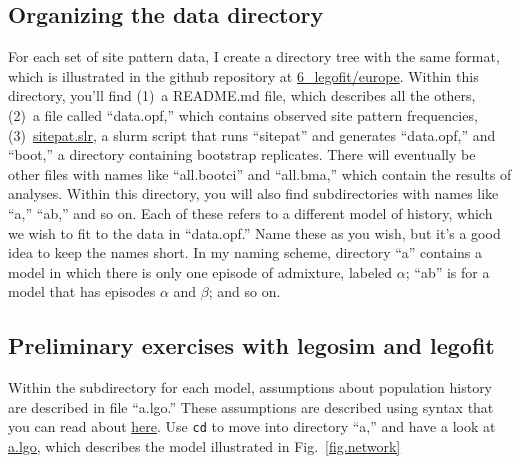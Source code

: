\documentclass[11pt]{article}
\begin{document}
\subsection{Organizing the data directory}
For each set of site pattern data, I create a directory tree with the
same format, which is illustrated in the github repository at
\href{\verb|https://github.com/alanrogers/agar22/blob/main/6_legofit/europe|}{6_legofit/europe}. Within
this directory, you'll find (1)~a README.md file, which describes all
the others, (2)~a file called ``data.opf,'' which contains observed
site pattern frequencies, (3)~\href{sitepat.slr.html}{sitepat.slr}, a
slurm script that runs ``sitepat'' and generates ``data.opf,'' and
``boot,'' a directory containing bootstrap replicates.  There will
eventually be other files with names like ``all.bootci'' and
``all.bma,'' which contain the results of analyses.  Within this
directory, you will also find subdirectories with names like ``a,''
``ab,'' and so on. Each of these refers to a different model of
history, which we wish to fit to the data in ``data.opf.''  Name these
as you wish, but it's a good idea to keep the names short. In my
naming scheme, directory ``a'' contains a model in which there is only
one episode of admixture, labeled $\alpha$; ``ab'' is for a model that
has episodes $\alpha$ and $\beta$; and so on.

\subsection{Preliminary exercises with legosim and legofit}
Within the subdirectory for each model, assumptions about population
history are described in file ``a.lgo.''  These assumptions are
described using syntax that you can read about
\href{http://alanrogers.github.io/legofit/html/index.html#lgo}{here}.
Use \texttt{cd} to move into directory ``a,'' and have a look at
\href{\verb|https://github.com/alanrogers/blob/main/agar22/6_legofit/europe/a/a.lgo|}{a.lgo},
which describes the model illustrated in Fig.~\ref{fig.network}
\end{document}
